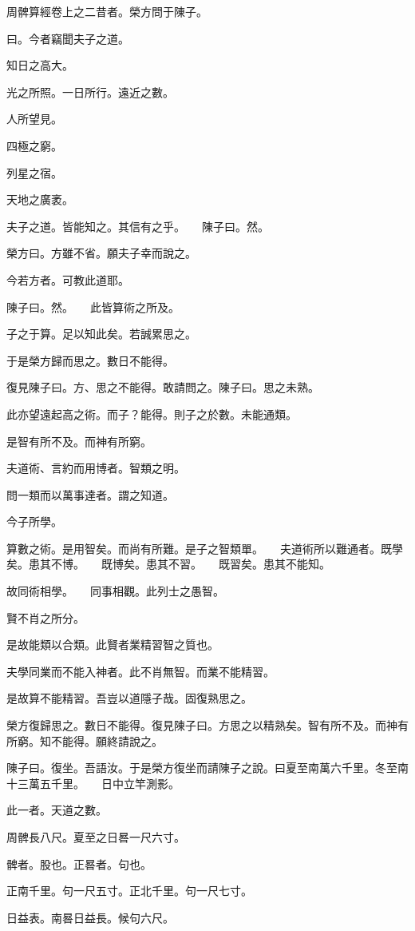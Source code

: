 \documentclass[a4paper,12pt,UTF8,twoside]{ctexbook}
\begin{document}
周髀算經卷上之二昔者。榮方問于陳子。

曰。今者竊聞夫子之道。

知日之高大。

光之所照。一日所行。遠近之數。

人所望見。

四極之窮。

列星之宿。

天地之廣袤。

夫子之道。皆能知之。其信有之乎。　　陳子曰。然。

榮方曰。方雖不省。願夫子幸而說之。

今若方者。可教此道耶。

陳子曰。然。　　此皆算術之所及。

子之于算。足以知此矣。若誠累思之。

于是榮方歸而思之。數日不能得。

復見陳子曰。方、思之不能得。敢請問之。陳子曰。思之未熟。

此亦望遠起高之術。而子？能得。則子之於數。未能通類。

是智有所不及。而神有所窮。

夫道術、言約而用博者。智類之明。

問一類而以萬事達者。謂之知道。

今子所學。

算數之術。是用智矣。而尚有所難。是子之智類單。　　夫道術所以難通者。既學矣。患其不博。　　既博矣。患其不習。　　既習矣。患其不能知。

故同術相學。　　同事相觀。此列士之愚智。

賢不肖之所分。

是故能類以合類。此賢者業精習智之質也。

夫學同業而不能入神者。此不肖無智。而業不能精習。

是故算不能精習。吾豈以道隱子哉。固復熟思之。

榮方復歸思之。數日不能得。復見陳子曰。方思之以精熟矣。智有所不及。而神有所窮。知不能得。願終請說之。

陳子曰。復坐。吾語汝。于是榮方復坐而請陳子之說。曰夏至南萬六千里。冬至南十三萬五千里。　　日中立竿測影。

此一者。天道之數。

周髀長八尺。夏至之日晷一尺六寸。

髀者。股也。正晷者。句也。

正南千里。句一尺五寸。正北千里。句一尺七寸。

日益表。南晷日益長。候句六尺。
\end{document}
